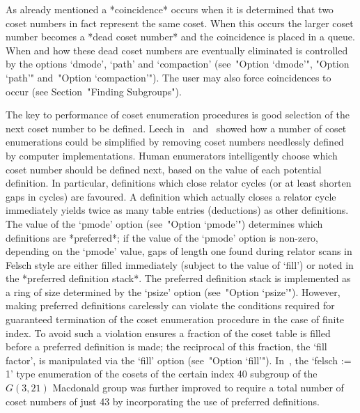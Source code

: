 As already mentioned a *coincidence* occurs when it
is determined that two coset numbers in fact represent the same coset.
When this occurs  the  larger  coset  number  becomes  a  *dead  coset
number* and the coincidence is placed in  a
queue. When and how these dead coset numbers are eventually eliminated
is  controlled  by  the  options  `dmode',  `path'  and   `compaction'
(see~"Option `dmode'", "Option `path'" and~"Option `compaction'"). The
user may  also  force  coincidences  to  occur  (see  Section~"Finding
Subgroups").

The key  to  performance  of  coset  enumeration  procedures  is  good
selection  of  the  next   coset   number   to   be   defined.   Leech
in~\cite{Lee77}  and~\cite{Lee84}  showed  how  a  number   of   coset
enumerations could be simplified by removing coset numbers  needlessly
defined by computer implementations. Human  enumerators  intelligently
choose which coset number should be defined next, based on  the  value
of each potential definition. In particular, definitions  which  close
relator cycles (or at least shorten gaps in cycles)  are  favoured.  A
definition which actually closes a relator  cycle  immediately  yields
twice as many table entries (deductions)  as  other  definitions.  The
value of the `pmode' option (see~"Option  `pmode'")  determines  which
definitions are *preferred*; if the value of  the  `pmode'  option  is
non-zero, depending on the `pmode' value, gaps  of  length  one  found
during relator scans in Felsch style  are  either  filled  immediately
(subject to the value of `fill') or noted in the *preferred definition
stack*.  The  preferred  definition
stack is implemented as a ring  of  size  determined  by  the  `psize'
option (see~"Option `psize'"). However, making  preferred  definitions
carelessly  can  violate  the  conditions  required   for   guaranteed
termination of the coset enumeration procedure in the case  of  finite
index. To avoid such a violation {\ACE}  ensures  a  fraction  of  the
coset table is filled before  a  preferred  definition  is  made;  the
reciprocal of this fraction, the `fill factor', is manipulated via the
`fill' option (see~"Option `fill'"). In~\cite{Hav91}, the  `felsch  :=
1' type enumeration of the cosets of the certain index 40 subgroup  of
the $G(3,21)$ Macdonald group was further improved to require a  total
number of coset numbers  of  just  43  by  incorporating  the  use  of
preferred definitions.

